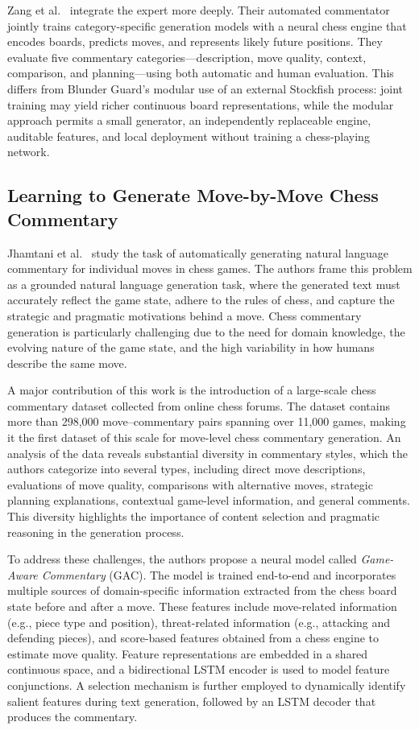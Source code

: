 \documentclass[sigconf,nonacm]{acmart}
\begin{document}
Zang et al.~\cite{zang2019automated} integrate the expert more deeply. Their automated commentator jointly trains category-specific generation models with a neural chess engine that encodes boards, predicts moves, and represents likely future positions. They evaluate five commentary categories---description, move quality, context, comparison, and planning---using both automatic and human evaluation. This differs from Blunder Guard's modular use of an external Stockfish process: joint training may yield richer continuous board representations, while the modular approach permits a small generator, an independently replaceable engine, auditable features, and local deployment without training a chess-playing network.

\subsection{Learning to Generate Move-by-Move Chess Commentary}

Jhamtani et al.~\cite{jhamtani2018chess} study the task of automatically generating natural language commentary for individual moves in chess games. The authors frame this problem as a grounded natural language generation task, where the generated text must accurately reflect the game state, adhere to the rules of chess, and capture the strategic and pragmatic motivations behind a move. Chess commentary generation is particularly challenging due to the need for domain knowledge, the evolving nature of the game state, and the high variability in how humans describe the same move.

A major contribution of this work is the introduction of a large-scale chess commentary dataset collected from online chess forums. The dataset contains more than 298,000 move--commentary pairs spanning over 11,000 games, making it the first dataset of this scale for move-level chess commentary generation. An analysis of the data reveals substantial diversity in commentary styles, which the authors categorize into several types, including direct move descriptions, evaluations of move quality, comparisons with alternative moves, strategic planning explanations, contextual game-level information, and general comments. This diversity highlights the importance of content selection and pragmatic reasoning in the generation process.

To address these challenges, the authors propose a neural model called \textit{Game-Aware Commentary} (GAC). The model is trained end-to-end and incorporates multiple sources of domain-specific information extracted from the chess board state before and after a move. These features include move-related information (e.g., piece type and position), threat-related information (e.g., attacking and defending pieces), and score-based features obtained from a chess engine to estimate move quality. Feature representations are embedded in a shared continuous space, and a bidirectional LSTM encoder is used to model feature conjunctions. A selection mechanism is further employed to dynamically identify salient features during text generation, followed by an LSTM decoder that produces the commentary.
\end{document}
